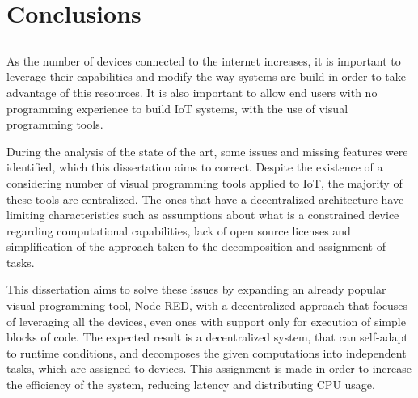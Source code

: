 \chapter{Conclusions} \label{chap:concl}

\section*{}

As the number of devices connected to the internet increases, it is important to leverage their capabilities and modify the way systems are build in order to take advantage of this resources. It is also important to allow end users with no programming experience to build IoT systems, with the use of visual programming tools. 
\par During the analysis of the state of the art, some issues and missing features were identified, which this dissertation aims to correct. Despite the existence of a considering number of visual programming tools applied to IoT, the majority of these tools are centralized. The ones that have a decentralized architecture have limiting characteristics such as assumptions about what is a constrained device regarding computational capabilities, lack of open source licenses and simplification of the approach taken to the decomposition and assignment of tasks.
\par This dissertation aims to solve these issues by expanding an already popular visual programming tool, Node-RED, with a decentralized approach that focuses of leveraging all the devices, even ones with support only for execution of simple blocks of code. The expected result is a decentralized system, that can self-adapt to runtime conditions, and decomposes the given computations into independent tasks, which are assigned to devices. This assignment is made in order to increase the efficiency of the system, reducing latency and distributing CPU usage.  





